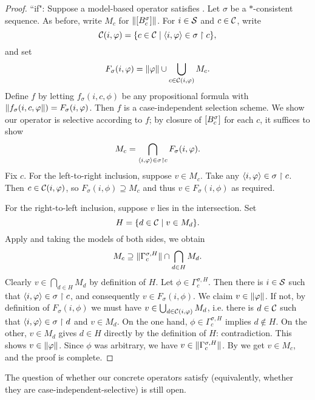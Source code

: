 \begin{proof}
    ``if": Suppose a model-based operator satisfies \hboundedness{}. Let
    $\sigma$ be a $\ast$-consistent sequence. As before, write $M_c$ for
    $\|{\left[{B^\sigma_c}\right]}\|$. For $i \in \mathcal{S}$ and $c \in \mathcal{C}$,
    write
    \[
        \mathcal{C}(i, \varphi) = \{c \in \mathcal{C} \mid \langle {i, \varphi} \rangle \in \sigma \upharpoonright c\},
    \]
    and set
    \[
        F_\sigma(i, \varphi)
        = \|{\varphi}\| \cup \bigcup_{c \in \mathcal{C}(i, \varphi)}{M_c}.
    \]
    Define $f$ by letting $f_\sigma(i, c, \phi)$ be any propositional formula
    with $\|{f_\sigma(i, c, \varphi}\|) = F_\sigma(i, \varphi)$. Then $f$ is a
    case-independent selection scheme. We show our operator is selective
    according to $f$; by closure of $\left[{B^\sigma_c}\right]$ for each $c$, it
    suffices to show
    \[
        M_c = \bigcap_{\langle {i, \varphi} \rangle \in \sigma \upharpoonright c}{F_\sigma(i, \varphi)}.
    \]
    Fix $c$. For the left-to-right inclusion, suppose $v \in M_c$. Take any
    $\langle {i, \varphi} \rangle \in \sigma \upharpoonright c$. Then $c \in \mathcal{C}(i, \varphi)$, so
    $F_\sigma(i, \phi) \supseteq M_c$ and thus $v \in F_\sigma(i, \phi)$ as
    required.

    For the right-to-left inclusion, suppose $v$ lies in the intersection. Set
    \[
        H = \{d \in \mathcal{C} \mid v \in M_d\}.
    \]
    Apply \hboundedness{} and taking the models of both sides, we obtain
    \begin{equation}
        \label{kr_eqn_hbnd_application}
        M_c
        \supseteq
        \|{\Gamma^{\sigma, H}_c}\| \cap \bigcap_{d \in H}{M_d}.
    \end{equation}
    Clearly $v \in \bigcap_{d \in H}{M_d}$ by definition of $H$. Let $\phi \in
    \Gamma^{\sigma, H}_c$. Then there is $i \in \mathcal{S}$ such that
    $\langle {i, \varphi} \rangle \in \sigma \upharpoonright c$, and consequently $v \in F_\sigma(i,
    \phi)$. We claim $v \in \|{\varphi}\|$. If not, by definition of
    $F_\sigma(i, \phi)$ we must have $v \in \bigcup_{d \in \mathcal{C}(i, \varphi)}{M_d}$,
    i.e. there is $d \in \mathcal{C}$ such that $\langle {i, \varphi} \rangle \in \sigma \upharpoonright d$ and
    $v \in M_d$. On the one hand, $\phi \in \Gamma^{\sigma, H}_c$ implies $d
    \notin H$. On the other, $v \in M_d$ gives $d \in H$ directly by the
    definition of $H$: contradiction. This shows $v \in \|{\varphi}\|$. Since
    $\phi$ was arbitrary, we have $v \in \|{\Gamma^{\sigma, H}_c}\|$. By
     we get $v \in M_c$, and the proof is
    complete.

\end{proof}

The question of whether our concrete operators satisfy \hboundedness{}
(equivalently, whether they are case-independent-selective) is still open.

